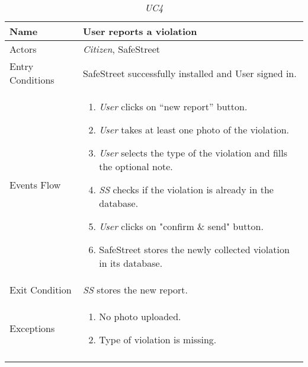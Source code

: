 \documentclass[../../../RASD.tex]{subfiles}
\begin{document}
    \begin{center}
        \begin{longtable}{| p{.35\linewidth} | p{.65\linewidth} |}
            \hline
            \textbf{Name} & \textbf{User reports a violation}\\ \hline
            Actors & \textit{Citizen}, SafeStreet\\ \hline
            Entry Conditions & SafeStreet successfully installed and User signed in.\\ \hline
            Events Flow &
            \begin{enumerate}
                \item \textit{User} clicks on “new report” button.
                \item \textit{User} takes at least one photo of the violation.
                \item \textit{User} selects the type of the violation and fills the optional note.
                \item \textit{SS} checks if the violation is already in the database.
                \item \textit{User} clicks on "confirm \& send" button.
                \item SafeStreet stores the newly collected violation in its database.
            \end{enumerate}
            \\ \hline
            Exit Condition & \textit{SS} stores the new report.\\ \hline
            Exceptions &
            \begin{enumerate}
                \item No photo uploaded.
                \item Type of violation is missing.
            \end{enumerate}
             \\
            \hline
            \caption[\textit{Use Case 4}]{\textit{UC4}}
        \end{longtable}
    \end{center}
    \newpage
\end{document}
